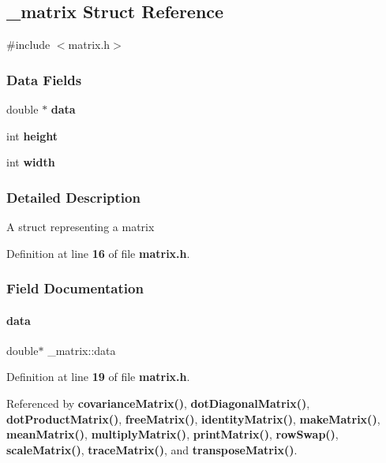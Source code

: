 \subsection{\+\_\+matrix Struct Reference}
\label{struct__matrix}


{\ttfamily \#include $<$matrix.\+h$>$}

\subsubsection*{Data Fields}
\begin{DoxyCompactItemize}
\item 
double $\ast$ \textbf{ data}
\item 
int \textbf{ height}
\item 
int \textbf{ width}
\end{DoxyCompactItemize}


\subsubsection{Detailed Description}
A struct representing a matrix 

Definition at line \textbf{ 16} of file \textbf{ matrix.\+h}.



\subsubsection{Field Documentation}
\mbox{\label{struct__matrix_ad3fdadaa9e22623d5830e37663d500be}} 
\paragraph{data}
{\footnotesize\ttfamily double$\ast$ \+\_\+matrix\+::data}



Definition at line \textbf{ 19} of file \textbf{ matrix.\+h}.



Referenced by \textbf{ covariance\+Matrix()}, \textbf{ dot\+Diagonal\+Matrix()}, \textbf{ dot\+Product\+Matrix()}, \textbf{ free\+Matrix()}, \textbf{ identity\+Matrix()}, \textbf{ make\+Matrix()}, \textbf{ mean\+Matrix()}, \textbf{ multiply\+Matrix()}, \textbf{ print\+Matrix()}, \textbf{ row\+Swap()}, \textbf{ scale\+Matrix()}, \textbf{ trace\+Matrix()}, and \textbf{ transpose\+Matrix()}.


